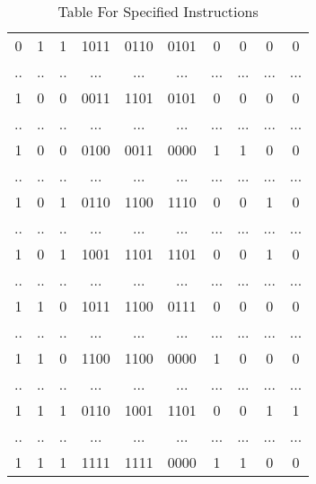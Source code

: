 \documentclass[12pt]{article}
\begin{document}
\begin{table}[H]
\begin{adjustbox}{width = \textwidth}
\begin{tabular}{|c c c|c|c|c|c|c|c|c|}
    0 & 1 & 1 & 1011& 0110& 0101& 0& 0& 0& 0\\

    .. & .. & .. & ...  & ...& ...& ...& ...& ...& ...\\

    1 & 0 & 0 & 0011& 1101& 0101& 0& 0& 0& 0\\

    .. & .. & .. & ...  & ...& ...& ...& ...& ...& ...\\

    1 & 0 & 0 & 0100& 0011& 0000&1 &1 &0 &0 \\

    .. & .. & .. & ...  & ...& ...& ...& ...& ...& ...\\

    1 & 0 & 1 &0110 & 1100& 1110& 0& 0& 1& 0\\

    .. & .. & .. & ...  & ...& ...& ...& ...& ...& ...\\

    1 & 0 & 1 & 1001& 1101& 1101& 0& 0& 1&0 \\

    .. & .. & .. & ...  & ...& ...& ...& ...& ...& ...\\

    1 & 1 & 0 & 1011& 1100& 0111& 0& 0&0 &0 \\

    .. & .. & .. & ...  & ...& ...& ...& ...& ...& ...\\

    1 & 1 & 0 & 1100& 1100& 0000& 1& 0& 0& 0\\

    .. & .. & .. & ...  & ...& ...& ...& ...& ...& ...\\

    1 & 1 & 1 & 0110& 1001& 1101& 0& 0& 1& 1\\

    .. & .. & .. & ...  & ...& ...& ...& ...& ...& ...\\

    1 & 1 & 1 & 1111 & 1111 & 0000& 1& 1& 0& 0\\

    \hline
    
    \end{tabular}
    
    \end{adjustbox}
    \caption{Table For Specified Instructions}
    \label{tab:Instructiontable}
\end{table} 
\end{document}

